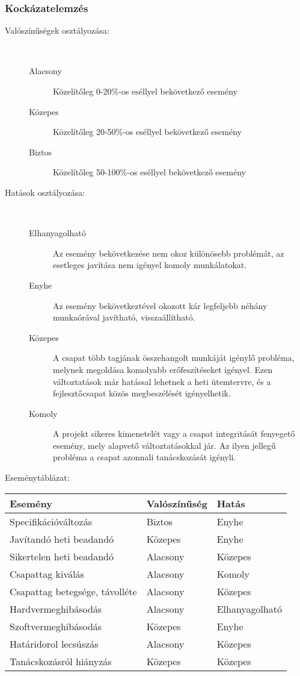    \subsubsection{Kockázatelemzés}
	\begin{description}
	\item[Valószínűségek osztályozása:] \hfill \\
		\begin{description}
			\item[Alacsony] Közelítőleg 0-20\%-os eséllyel bekövetkező esemény
			\item[Közepes] Közelítőleg 20-50\%-os eséllyel bekövetkező esemény
			\item[Biztos] Közelítőleg 50-100\%-os eséllyel bekövetkező esemény
		\end{description}
	\item[Hatások osztályozása:] \hfill \\
		\begin{description}
			\item[Elhanyagolható] Az esemény bekövetkezése nem okoz különösebb problémát, az esetleges javítása nem igényel komoly munkálatokat.
			\item[Enyhe] Az esemény bekövetkeztével okozott kár legfeljebb néhány munkaórával javítható, visszaállítható.
			\item[Közepes] A csapat több tagjának összehangolt munkáját igénylő probléma, melynek megoldása komolyabb erőfeszítéseket igényel. Ezen változtatások már hatással lehetnek a heti ütemtervre, és a fejlesztőcsapat közös
megbeszélését igényelhetik.
			\item[Komoly] A projekt sikeres kimenetelét vagy a csapat integritását fenyegető esemény, mely alapvető változtatásokkal jár. Az ilyen jellegű probléma a csapat azonnali tanácskozását igényli.
		\end{description}
	\end{description}

	Eseménytáblázat:
	\begin{center}
		\begin{tabular}{| l | l | l |}
			\hline
			\textbf{Esemény}			&	\textbf{Valószínűség}	&	\textbf{Hatás}\\
			\hline
			Specifikációváltozás			&	Biztos				&	Enyhe\\
			\hline
			Javítandó heti beadandó		&	Közepes			&	Enyhe\\
			\hline
			Sikertelen heti beadandó		&	Alacsony			&	Közepes\\
			\hline
			Csapattag kiválás			&	Alacsony			&	Komoly\\
			\hline
			Csapattag betegsége, távolléte	&	Alacsony			&	Közepes\\
			\hline
			Hardvermeghibásodás		&	Alacsony			&	Elhanyagolható\\
			\hline
			Szoftvermeghibásodás		&	Közepes			&	Enyhe\\
			\hline
			Határidorol lecsúszás		&	Alacsony			&	Közepes\\
			\hline
			Tanácskozásról hiányzás		&	Közepes			&	Közepes\\
			\hline
		\end{tabular}
	\end{center}

